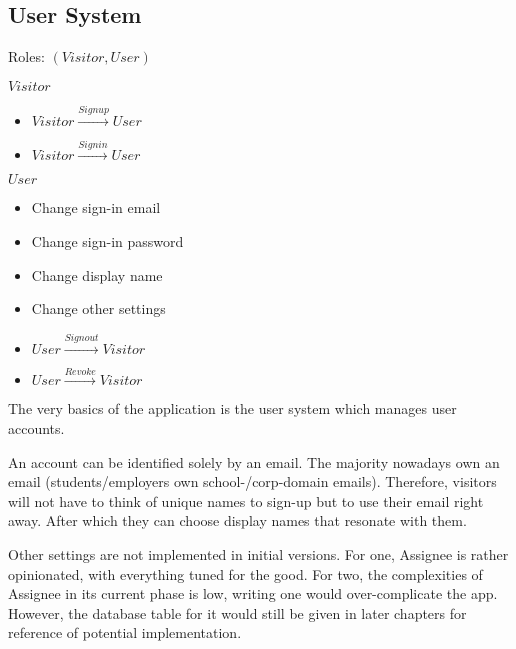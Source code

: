 \subsection{User System}
\label{overview.capab.user}

Roles: $(Visitor, User)$

$Visitor$
\begin{itemize}
	\item $Visitor\xrightarrow{Signup}User$

	\item $Visitor\xrightarrow{Signin}User$
\end{itemize}

$User$
\begin{itemize}
	\item Change sign-in email

	\item Change sign-in password

	\item Change display name

	\item Change other settings \textdagger{}

	\item $User\xrightarrow{Signout}Visitor$

	\item $User\xrightarrow{Revoke}Visitor$
\end{itemize}

The very basics of the application is the user system which manages user
accounts.

An account can be identified solely by an email. The majority nowadays own an email
(students/employers own school-/corp-domain emails). Therefore, visitors will
not have to think of unique names to sign-up but to use their email right away. After
which they can choose display names that resonate with them.

\textdagger{} Other settings are not implemented in initial versions. For one,
Assignee is rather opinionated, with everything tuned for the good. For two, the
complexities of Assignee in its current phase is low, writing one would over-complicate
the app. However, the database table for it would still be given in later
chapters for reference of potential implementation.


